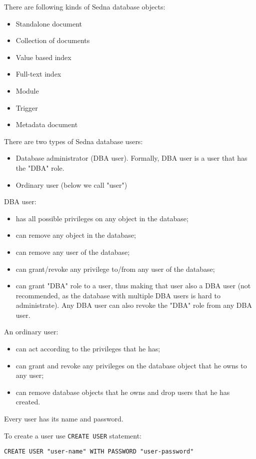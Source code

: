 \documentclass[a4paper,12pt]{article}
\newenvironment{citemize}
{\begin{itemize}
  \setlength{\itemsep}{0pt}
  \setlength{\parskip}{0pt}
  \setlength{\parsep}{0pt}}
{\end{itemize}}
\begin{document}
There are following kinds of Sedna database objects:
\begin{citemize}
\item Standalone document
\item Collection of documents
\item Value based index
\item Full-text index
\item Module
\item Trigger
\item Metadata document
\end{citemize}

There are two types of Sedna database users:

\begin{citemize}
\item Database administrator (DBA user). Formally, DBA user is a user that has
the "DBA" role.
\item Ordinary user (below we call "user")
\end{citemize}

DBA user:
\begin{citemize}
\item has all possible privileges on any object in the database;
\item can remove any object in the database;
\item can remove any user of the database;
\item can grant/revoke any privilege to/from any user of the database;
\item can grant "DBA" role to a user, thus making that user also a DBA user
(not recommended, as the database with multiple DBA users is hard to
administrate). Any DBA user can also revoke the "DBA" role from any DBA user.
\end{citemize}

An ordinary user:
\begin{citemize}
\item can act according to the privileges that he has;
\item can grant and revoke any privileges on the database object that he owns
to any user;
\item can remove database objects that he owns and drop users that he has
created.
\end{citemize}

Every user has its name and password.

To create a user use \verb!CREATE USER! statement:

\begin{verbatim}
CREATE USER "user-name" WITH PASSWORD "user-password"
\end{verbatim}
\end{document}
